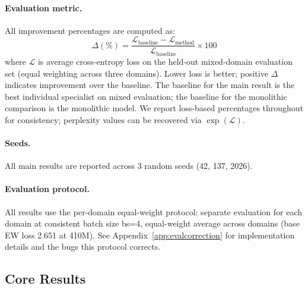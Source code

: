 \documentclass{article}
\begin{document}
\paragraph{Evaluation metric.} All improvement percentages are computed as:
\[
\Delta(\%) = \frac{\mathcal{L}_\text{baseline} - \mathcal{L}_\text{method}}{\mathcal{L}_\text{baseline}} \times 100
\]
where $\mathcal{L}$ is average cross-entropy loss on the held-out mixed-domain evaluation set (equal weighting across three domains). Lower loss is better; positive $\Delta$ indicates improvement over the baseline. The baseline for the main result is the best individual specialist on mixed evaluation; the baseline for the monolithic comparison is the monolithic model. We report loss-based percentages throughout for consistency; perplexity values can be recovered via $\exp(\mathcal{L})$.

\paragraph{Seeds.} All main results are reported across 3 random seeds (42, 137, 2026).

\paragraph{Evaluation protocol.} All results use the per-domain equal-weight protocol: separate evaluation for each domain at consistent batch size bs=4, equal-weight average across domains (base EW loss 2.651 at 410M). See Appendix~\ref{app:evalcorrection} for implementation details and the bugs this protocol corrects.

\subsection{Core Results}
\label{sec:core}
\end{document}
